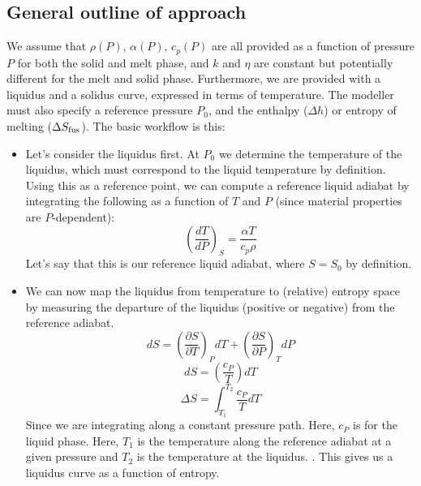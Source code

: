\subsection{General outline of approach}
We assume that $\rho(P)$, $\alpha(P)$, $c_p(P)$ are all provided as a function of pressure $P$ for both the solid and melt phase, and $k$ and $\eta$ are constant but potentially different for the melt and solid phase. Furthermore, we are provided with a liquidus and a solidus curve, expressed in terms of temperature.  The modeller must also specify a reference pressure $P_0$, and the enthalpy ($\Delta h$) or entropy of melting ($\Delta S_{\rm fus}$).  The basic workflow is this:
\begin{itemize}
\item Let's consider the liquidus first.  At $P_0$ we determine the temperature of the liquidus, which must correspond to the liquid temperature by definition.  Using this as a reference point, we can compute a reference liquid adiabat by integrating the following as a function of $T$ and $P$ (since material properties are $P$-dependent):
\begin{equation}
\left( \frac{dT}{dP} \right)_S = \frac{\alpha T}{c_p \rho}
\label{eqn:adiabat}
\end{equation}
Let's say that this is our reference liquid adiabat, where $S=S_0$ by definition.
\item We can now map the liquidus from temperature to (relative) entropy space by measuring the departure of the liquidus (positive or negative) from the reference adiabat.
\begin{equation}
dS = \left( \frac{\partial S}{\partial T} \right)_P dT + \left( \frac{\partial S}{\partial P} \right)_T dP
\end{equation}
\begin{equation}
dS = \left( \frac{c_P}{T} \right) dT
\label{eqn:dS}
\end{equation}
\begin{equation}
\Delta S = \int_{T_1}^{T_{2}} \frac{c_P}{T} dT
\label{eqn:int_dS}
\end{equation}
Since we are integrating along a constant pressure path.  Here, $c_P$ is for the liquid phase.  Here, $T_1$ is the temperature along the reference adiabat at a given pressure and $T_2$ is the temperature at the liquidus.   .  This gives us a liquidus curve as a function of entropy.

\end{itemize}
